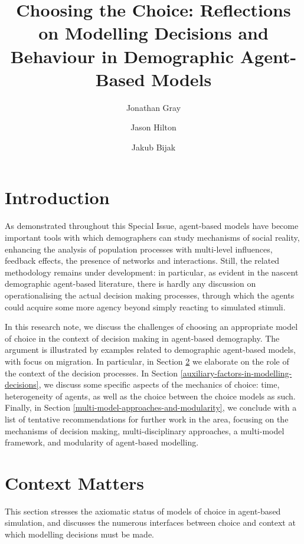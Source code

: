\documentclass{article}
\begin{document}
\title{Choosing the Choice: Reflections on Modelling Decisions and Behaviour in Demographic Agent-Based Models}
\author{Jonathan Gray \and Jason Hilton \and Jakub Bijak}

\maketitle

\section{Introduction}
\label{sec:intro}

As demonstrated throughout this Special Issue, agent-based models have become important tools with which demographers can study mechanisms of social reality, enhancing the analysis of population processes with multi-level influences, feedback effects, the presence of networks and interactions. Still, the related methodology remains under development: in particular, as evident in the nascent demographic agent-based literature, there is hardly any discussion on operationalising the actual decision making processes, through which the agents could acquire some more agency beyond simply reacting to simulated stimuli. 

In this research note, we discuss the challenges of choosing an appropriate model of choice in the context of decision making in agent-based demography. The argument is illustrated by examples related to demographic agent-based models, with focus on migration. In particular, in Section \ref{sec:context_matters} we elaborate on the role of the context of the decision processes. In Section \ref{auxiliary-factors-in-modelling-decisions}, we discuss some specific aspects of the mechanics of choice: time, heterogeneity of agents, as well as the choice between the choice models as such. Finally, in Section \ref{multi-model-approaches-and-modularity}, we conclude with a list of tentative recommendations for further work in the area, focusing on the mechanisms of decision making, multi-disciplinary approaches, a multi-model framework, and modularity of agent-based modelling.


\section{Context Matters}
\label{sec:context_matters}

This section stresses the axiomatic status of models of choice in agent-based simulation, and discusses the numerous interfaces between choice and context at which modelling decisions must be made.
\end{document}
